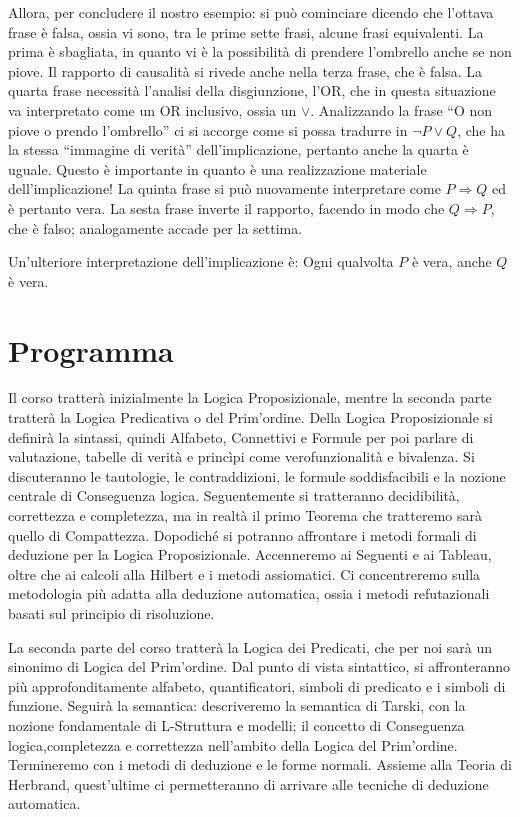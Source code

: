 Allora, per concludere il nostro esempio: si può cominciare dicendo che l'ottava 
frase è falsa, ossia vi sono, tra le prime sette frasi, alcune frasi equivalenti. 
La prima è sbagliata, in quanto vi è la possibilità di prendere l'ombrello 
anche se non piove. Il rapporto di causalità si rivede anche nella terza frase, 
che è falsa. La quarta frase necessità l'analisi della disgiunzione, l'OR, 
che in questa situazione va interpretato come un OR inclusivo, ossia un 
$\lor$. Analizzando la frase ``O non piove o prendo l'ombrello'' ci si accorge 
come si possa tradurre in $\neg P \lor Q$, che ha la stessa ``immagine di 
verità'' dell'implicazione, pertanto anche la quarta è uguale. Questo è importante 
in quanto è una realizzazione materiale dell'implicazione! 
La quinta frase si può nuovamente interpretare come $P\Rightarrow Q$ ed è pertanto 
vera. 
La sesta frase inverte il rapporto, facendo in modo che $Q \Rightarrow P$, che 
è falso; analogamente accade per la settima. 

Un'ulteriore interpretazione dell'implicazione è: Ogni qualvolta $P$ è vera, 
anche $Q$ è vera. 

\section{Programma}
Il corso tratterà inizialmente la Logica Proposizionale, mentre la seconda 
parte tratterà la Logica Predicativa o del Prim'ordine. Della Logica Proposizionale 
si definirà la sintassi, quindi Alfabeto, Connettivi e Formule per poi parlare
di valutazione, tabelle di verità e princìpi come verofunzionalità e bivalenza. 
Si discuteranno le tautologie, le contraddizioni, le formule soddisfacibili e
la nozione centrale di Conseguenza logica. Seguentemente si 
tratteranno decidibilità, correttezza e completezza, ma in realtà il primo Teorema 
che tratteremo sarà quello di Compattezza. Dopodiché si potranno affrontare 
i metodi formali di deduzione per la Logica Proposizionale. Accenneremo ai 
Seguenti e ai Tableau, oltre che ai calcoli alla Hilbert e i metodi assiomatici. 
Ci concentreremo sulla metodologia più adatta alla deduzione automatica, ossia 
i metodi refutazionali basati sul principio di risoluzione. 

La seconda parte del corso tratterà la Logica dei Predicati, che per noi 
sarà un sinonimo di Logica del Prim'ordine. Dal punto di vista sintattico, 
si affronteranno più approfonditamente alfabeto, quantificatori, simboli 
di predicato e i simboli di funzione. Seguirà la semantica: descriveremo la 
semantica di Tarski, con la nozione fondamentale di L-Struttura e modelli; il 
concetto di Conseguenza logica,completezza e correttezza nell'ambito 
della Logica del Prim'ordine. Termineremo con i metodi di deduzione e le forme 
normali. Assieme alla Teoria di Herbrand, quest'ultime ci permetteranno di 
arrivare alle tecniche di deduzione automatica. 

